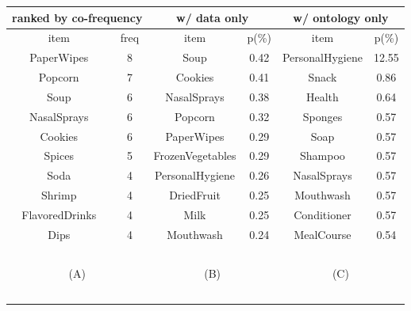\begin{table}[tbh]\scriptsize
\begin{center}
\begin{tabular}{ c c || c c | c c }
\hline
\multicolumn{2}{c||}{ranked by co-frequency}&\multicolumn{2}{c|}{w/ data only}&\multicolumn{2}{c}{w/ ontology only}\\
\hline
item	&	freq	&	item	&	p(\%)	&	item	&	p(\%)	\\
\hline											
PaperWipes	&	8	&	Soup	&	0.42	&	PersonalHygiene	&	12.55	\\
Popcorn	&	7	&	Cookies	&	0.41	&	Snack	&	0.86	\\
Soup	&	6	&	NasalSprays	&	0.38	&	Health	&	0.64	\\
NasalSprays	&	6	&	Popcorn	&	0.32	&	Sponges	&	0.57	\\
Cookies	&	6	&	PaperWipes	&	0.29	&	Soap	&	0.57	\\
Spices	&	5	&	FrozenVegetables	&	0.29	&	Shampoo	&	0.57	\\
Soda	&	4	&	PersonalHygiene	&	0.26	&	NasalSprays	&	0.57	\\
Shrimp	&	4	&	DriedFruit	&	0.25	&	Mouthwash	&	0.57	\\
FlavoredDrinks	&	4	&	Milk	&	0.25	&	Conditioner	&	0.57	\\
Dips	&	4	&	Mouthwash	&	0.24	&	MealCourse	&	0.54	\\
\hline
\multicolumn{6}{c}{~}\\
\multicolumn{2}{c}{(A)}  &   \multicolumn{2}{c}{(B)}  &   \multicolumn{2}{c}{(C)}  \\
\multicolumn{6}{c}{~}\\
\end{tabular}


\end{center}
\end{table}
